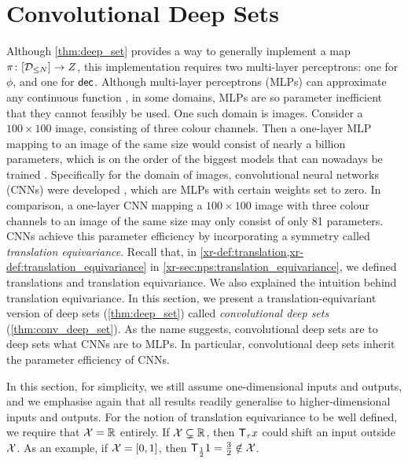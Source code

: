 \documentclass[12pt, twoside]{report}
\newcommand{\xrprefix}[1]{xr-#1}
\begin{document}
\section{Convolutional Deep Sets}
\label{sec:repr_theorems:conv_deep_sets}

Although \cref{thm:deep_set} provides a way to generally implement a map $\pi\colon[\mathcal{D}_{\le N}] \to Z$, this implementation requires two multi-layer perceptrons: one for $\phi$, and one for $\mathsf{dec}$.
Although multi-layer perceptrons (MLPs) can approximate any continuous function \parencite{Cybenko:1989:Approximation_by_Superpositions_of_a},
in some domains, MLPs are so parameter inefficient that they cannot feasibly be used.
One such domain is images.
Consider a $100\times100$ image, consisting of three colour channels. 
Then a one-layer MLP mapping to an image of the same size would consist of nearly a billion parameters, which is on the order of the biggest models that can nowadays be trained \parencite{Brown:2020:Language_Models_Are_Few-Shot_Learners}.
Specifically for the domain of images, convolutional neural networks (CNNs) were developed \parencite{Fukushima:1982:Neocognitron_A_Self-Organizing_Neural_Network}, which are MLPs with certain weights set to zero.
In comparison, a one-layer CNN mapping a $100\times100$ image with three colour channels to an image of the same size may only consist of only 81 parameters.
CNNs achieve this parameter efficiency by incorporating a symmetry called \emph{translation equivariance}.
Recall that, in \cref{\xrprefix{def:translation},\xrprefix{def:translation_equivariance}} in \cref{\xrprefix{sec:nps:translation_equivariance}}, we defined translations and translation equivariance.
We also explained the intuition behind translation equivariance.
In this section, we present a translation-equivariant version of deep sets (\cref{thm:deep_set}) called \emph{convolutional deep sets} (\cref{thm:conv_deep_set}).
As the name suggests, convolutional deep sets are to deep sets what CNNs are to MLPs.
In particular, convolutional deep sets inherit the parameter efficiency of CNNs.

In this section, for simplicity, we still assume one-dimensional inputs and outputs,
and we emphasise again that all results readily generalise to higher-dimensional inputs and outputs.
For the notion of translation equivariance to be well defined, we require that $\mathcal{X} = \mathbb{R}$ entirely.
If $\mathcal{X} \subsetneq \mathbb{R}$, then $\T_\tau x$ could shift an input outside $\mathcal{X}$.
As an example, if $\mathcal{X} = [0, 1]$, then $\T_{\frac12} 1 = \tfrac32 \notin \X$.
\end{document}
